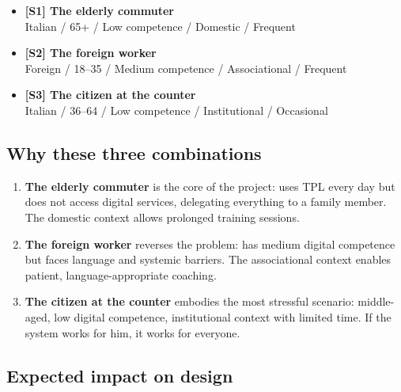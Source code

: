 ﻿\documentclass[11pt,a4paper]{article}
\begin{document}
\begin{tcolorbox}[base]
\begin{itemize}[leftmargin=*,itemsep=6pt]
    \item {}\label{seg:anziana}
    \textbf{[S1] The elderly commuter}\\
    Italian / 65+ / Low competence / Domestic / Frequent
    \item {}\label{seg:straniero}
    \textbf{[S2] The foreign worker}\\
    Foreign / 18--35 / Medium competence / Associational / Frequent
    \item {}\label{seg:cittadino}
    \textbf{[S3] The citizen at the counter}\\
    Italian / 36--64 / Low competence / Institutional / Occasional
\end{itemize}
\end{tcolorbox}

\vspace{0.4cm}

\subsection{Why these three combinations}

\begin{enumerate}[leftmargin=*]
    \item \textbf{The elderly commuter} is the core of the project:
    uses TPL every day but does not access digital services, delegating
    everything to a family member. The domestic context allows prolonged
    training sessions.
    \item \textbf{The foreign worker} reverses the problem:
    has medium digital competence but faces language and systemic
    barriers. The associational context enables patient,
    language-appropriate coaching.
    \item \textbf{The citizen at the counter} embodies the most
    stressful scenario: middle-aged, low digital competence, institutional
    context with limited time. If the system works for him,
    it works for everyone.
\end{enumerate}

\vspace{0.4cm}

\subsection{Expected impact on design}
\end{document}
